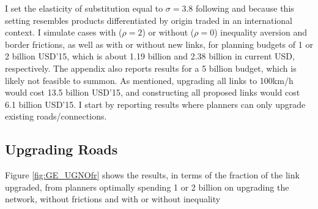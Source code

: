 \documentclass[a4paper]{article}
\begin{document}
I set the elasticity of substitution equal to $\sigma = 3.8$ following \citet{bajzik2020estimating} and \citet{armington1969theory} because this setting resembles products differentiated by origin traded in an international context. I simulate cases with ($\rho = 2$) or without ($\rho = 0$) inequality aversion and border frictions, as well as with or without new links, for planning budgets of 1 or 2 billion USD'15, which is about 1.19 billion and 2.38 billion in current USD, respectively. The appendix also reports results for a 5 billion budget, which is likely not feasible to summon. As mentioned, upgrading all links to 100km/h would cost 13.5 billion USD'15, and constructing all proposed links would cost 6.1 billion USD'15. I start by reporting results where planners can only upgrade existing roads/connections. 

\subsection{Upgrading Roads} 

Figure \ref{fig:GE_UGNOfr} shows the results, in terms of the fraction of the link upgraded, from planners optimally spending 1 or 2 billion on upgrading the network, without frictions and with or without inequality 
\end{document}

